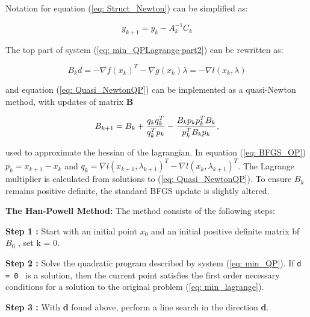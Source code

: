 \vspace{0.15 in}\noindent 
Notation for equation (\ref{eq: Struct_Newton}) can be simplified as:

\[ y_{k+1} = y_k - A_k^{-1}C_k \]

\vspace{0.15 in}\noindent 
The top part of system (\ref{eq: min_QPLagrange-part2}) can be rewritten as:

\begin{equation}
B_k d = - \nabla f(x_k)^T - \nabla g(x_k) \lambda = - \nabla l(x_k, \lambda)
\label{eq: Quasi_NewtonQP}
\end{equation}

\vspace{0.15 in}\noindent
and equation (\ref{eq: Quasi_NewtonQP}) can be implemented as a quasi-Newton
method, with updates of matrix {\bf B}

\begin{equation}
 B_{k+1} = B_{k} + {{q_k q_k^T} \over {q_k^Tp_k}} - {{B_kp_kp_k^TB_k} \over {p_k^TB_kp_k}},
\label{eq: BFGS_OP}
\end{equation}

\vspace{0.15 in}\noindent
used to approximate the hessian of the lagrangian.
In equation (\ref{eq: BFGS_OP}) $p_k = x_{k+1} - x_k$
and $q_k = \nabla l (x_{k+1},\lambda_{k+1})^T - \nabla l (x_k, \lambda_{k+1})^T$.
The Lagrange multiplier is calculated from solutions to (\ref{eq: Quasi_NewtonQP}).
To ensure $B_k$ remains positive definite,
the standard BFGS update is slightly altered.

\vspace{0.15 in}\noindent
{\bf The Han-Powell Method:} The method consists of the following steps:

\vspace{0.15 in}\noindent
{\bf Step 1 :}
Start with an initial point {\bf $ x_0 $ } and an initial positive 
definite matrix {bf $ B_0 $ }, set k = 0.

\vspace{0.15 in}\noindent
{\bf Step 2 :}
Solve the quadratic program described by system (\ref{eq: min_QP}).
If {\tt d = 0 } is a solution, then the current point satisfies
the first order necessary conditions for a
solution to the original problem (\ref{eq: min_lagrange}).

\vspace{0.15 in}\noindent
{\bf Step 3 :}
With {\bf d} found above, perform a line search in the direction {\bf d}. 

